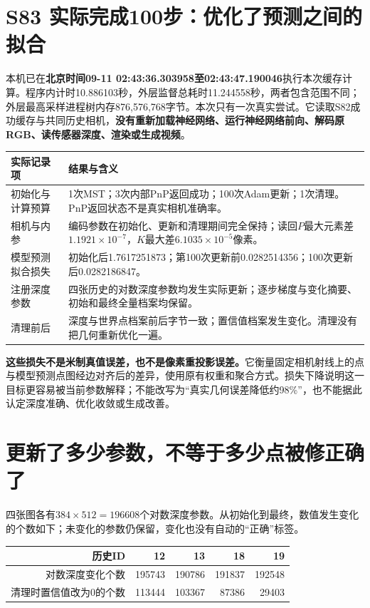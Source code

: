 \section{ S83 实际完成100步：优化了预测之间的拟合}
本机已在\textbf{北京时间09-11 02:43:36.303958至02:43:47.190046}执行本次缓存计算。程序内计时10.886103秒，外层监督总耗时11.244558秒，两者包含范围不同；外层最高采样进程树内存876,576,768字节。本次只有一次真实尝试。它读取S82成功缓存与共同历史相机，\textbf{没有重新加载神经网络、运行神经网络前向、解码原RGB、读传感器深度、渲染或生成视频}。

\begin{center}\small
\begin{tabular}{p{4.1cm}p{10.8cm}}\toprule
实际记录项&结果与含义\\\midrule
初始化与计算预算&1次MST；3次内部PnP返回成功；100次Adam更新；1次清理。PnP返回状态不是真实相机准确率。\\
相机与内参&编码参数在初始化、更新和清理期间完全保持；读回$P$最大元素差$1.1921\times10^{-7}$，$K$最大差$6.1035\times10^{-5}$像素。\\
模型预测拟合损失&初始化后1.7617251873；第100次更新前0.0282514356；100次更新后0.0282186847。\\
注册深度参数&四张历史的对数深度参数均发生实际更新；逐步梯度与变化摘要、初始和最终全量档案均保留。\\
清理前后&深度与世界点档案前后字节一致；置信值档案发生变化。清理没有把几何重新优化一遍。\\\bottomrule
\end{tabular}\end{center}

\noindent\textbf{这些损失不是米制真值误差，也不是像素重投影误差。}它衡量固定相机射线上的点与模型预测点图经边对齐后的差异，使用原有权重和聚合方式。损失下降说明这一目标更容易被当前参数解释；不能改写为“真实几何误差降低约98\%”，也不能据此认定深度准确、优化收敛或生成改善。

\section{ 更新了多少参数，不等于多少点被修正确了}
四张图各有$384\times512=196608$个对数深度参数。从初始化到最终，数值发生变化的个数如下；未变化的参数仍保留，变化也没有自动的“正确”标签。

\begin{center}
\begin{tabular}{rrrrr}\toprule
历史ID&12&13&18&19\\\midrule
对数深度变化个数&195743&190786&191837&192548\\
清理时置信值改为0的个数&113444&103367&87386&29403\\\bottomrule
\end{tabular}\end{center}

